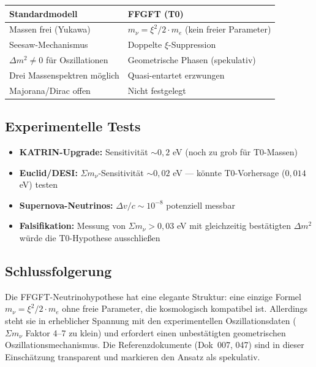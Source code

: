 	\begin{center}
		\begin{tabular}{p{}p{}}
			\textbf{Standardmodell} & \textbf{FFGFT (T0)} \\
			\hline
			Massen frei (Yukawa) & \(m_\nu = \xi^2/2 \cdot m_e\) (kein freier Parameter) \\
			Seesaw-Mechanismus & Doppelte \(\xi\)-Suppression \\
			\(\Delta m^2 \neq 0\) für Oszillationen & Geometrische Phasen (spekulativ) \\
			Drei Massenspektren möglich & Quasi-entartet erzwungen \\
			Majorana/Dirac offen & Nicht festgelegt \\
		\end{tabular}
	\end{center}
	
	\subsection*{Experimentelle Tests}
	
	\begin{itemize}
		\item \textbf{KATRIN-Upgrade:} Sensitivität \(\sim 0{,}2\) eV (noch zu grob für T0-Massen)
		\item \textbf{Euclid/DESI:} \(\Sigma m_\nu\)-Sensitivität \(\sim 0{,}02\) eV — könnte T0-Vorhersage (\(0{,}014\) eV) testen
		\item \textbf{Supernova-Neutrinos:} \(\Delta v/c \sim 10^{-8}\) potenziell messbar
		\item \textbf{Falsifikation:} Messung von \(\Sigma m_\nu > 0{,}03\) eV mit gleichzeitig bestätigten \(\Delta m^2\) würde die T0-Hypothese ausschließen
	\end{itemize}
	
	\subsection*{Schlussfolgerung}
	
	Die FFGFT-Neutrinohypothese hat eine elegante Struktur: eine einzige Formel \(m_\nu = \xi^2/2 \cdot m_e\) ohne freie Parameter, die kosmologisch kompatibel ist. Allerdings steht sie in erheblicher Spannung mit den experimentellen Oszillationsdaten (\(\Sigma m_\nu\) Faktor 4--7 zu klein) und erfordert einen unbestätigten geometrischen Oszillationsmechanismus. Die Referenzdokumente (Dok~007, 047) sind in dieser Einschätzung transparent und markieren den Ansatz als spekulativ.


